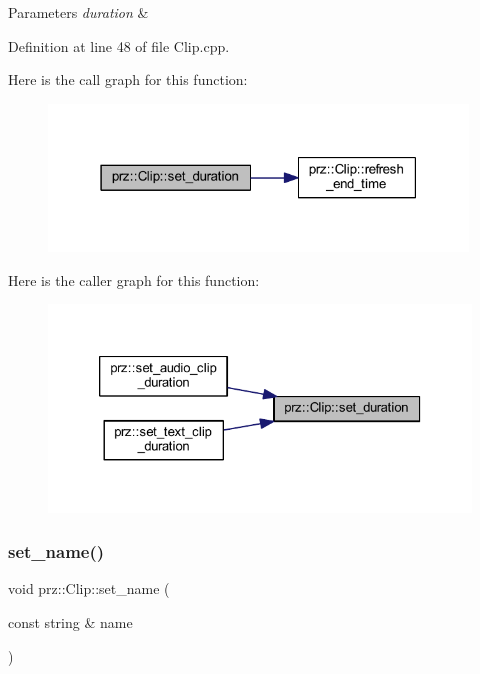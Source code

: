 \begin{DoxyParams}{Parameters}
{\em duration} & \\
\hline
\end{DoxyParams}


Definition at line 48 of file Clip.\+cpp.

Here is the call graph for this function\+:
\nopagebreak
\begin{figure}[H]
\begin{center}
\leavevmode
\includegraphics[width=316pt]{classprz_1_1_clip_a7555fe34e45f6032ea282ca6d605ace6_cgraph}
\end{center}
\end{figure}
Here is the caller graph for this function\+:
\nopagebreak
\begin{figure}[H]
\begin{center}
\leavevmode
\includegraphics[width=326pt]{classprz_1_1_clip_a7555fe34e45f6032ea282ca6d605ace6_icgraph}
\end{center}
\end{figure}
\mbox{\label{classprz_1_1_clip_a4228c95183be5c9e2bd9eabd58828243}} 
\subsubsection{\texorpdfstring{set\_name()}{set\_name()}}
{\footnotesize\ttfamily void prz\+::\+Clip\+::set\+\_\+name (\begin{DoxyParamCaption}\item[{const string \&}]{name }\end{DoxyParamCaption})}



